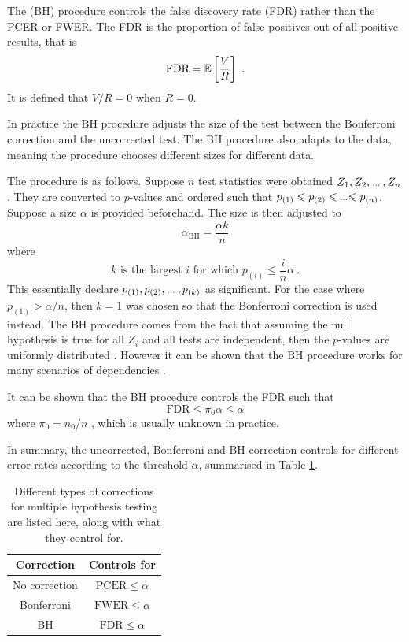 The \cite{benjamini1995controlling} (BH) procedure controls the false discovery rate (FDR) \citep{benjamini2010discovering} rather than the PCER or FWER. The FDR is the proportion of false positives out of all positive results, that is
\begin{equation}
    \text{FDR} = \operatorname{\mathbb{E}}\left[
        \dfrac{V}{R}
    \right]
    \ .
\end{equation}
It is defined that $V/R=0$ when $R=0$.

In practice the BH procedure adjusts the size of the test between the Bonferroni correction and the uncorrected test. The BH procedure also adapts to the data, meaning the procedure chooses different sizes for different data.

The procedure is as follows. Suppose $n$ test statistics were obtained $Z_1,Z_2,\dotdotdot,Z_n$. They are converted to $p$-values and ordered such that $p_{(1)}\leqslant p_{(2)}\leqslant \dotdotdot \leqslant p_{(n)}$. Suppose a size $\alpha$ is provided beforehand. The size is then adjusted to
\begin{equation}
    \alpha_{\text{BH}} = \frac{\alpha k}{n}
\end{equation}
where
\begin{equation}
    k\text{ is the largest }i\text{ for which }p_{(i)}\leqslant\frac{i}{n}\alpha
    \ .
\end{equation}
This essentially declare $p_{(1)},p_{(2)},\dotdotdot,p_{(k)}$ as significant. For the case where $p_{(1)}>\alpha/n$, then $k=1$ was chosen so that the Bonferroni correction is used instead. The BH procedure comes from the fact that assuming the null hypothesis is true for all $Z_i$ and all tests are independent, then the $p$-values are uniformly distributed \citep{simes1986improved}. However it can be shown that the BH procedure works for many scenarios of dependencies \citep{benjamini2001control}. 

It can be shown that the BH procedure controls the FDR such that
\begin{equation}
    \text{FDR}\leqslant\pi_0\alpha\leqslant\alpha
\end{equation}
where $\pi_0=n_0/n$ \citep{benjamini1995controlling}, which is usually unknown in practice.

In summary, the uncorrected, Bonferroni and BH correction controls for different error rates according to the threshold $\alpha$, summarised in Table \ref{table:inference_corrections}.

\begin{table}
    \centering
    \begin{tabular}{c|c}
        Correction&Controls for\\\hline
        No correction&$\text{PCER}\leqslant\alpha$\\
        Bonferroni&$\text{FWER}\leqslant\alpha$\\
        BH&$\text{FDR}\leqslant\alpha$
    \end{tabular}
    \caption{Different types of corrections for multiple hypothesis testing are listed here, along with what they control for.}
    \label{table:inference_corrections}
\end{table}

